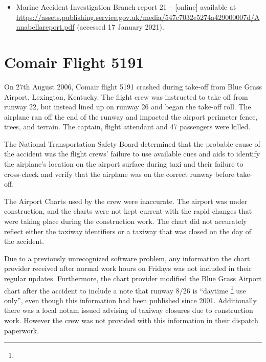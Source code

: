 \begin{itemize}
\item Marine Accident Investigation Branch report 21 --  [online] available at \href{https://assets.publishing.service.gov.uk/media/547c7032e5274a429000007d/Annabellareport.pdf}{https://assets.publishing.service.gov.uk/media/547c7032e5274a429000007d/Annabellareport.pdf} (accessed 17 January 2021).
\end{itemize}

\section{Comair Flight 5191} \label{bkm:incacc:comair5191}
On 27th August 2006, Comair flight 5191 crashed during take-off from Blue Grass Airport, Lexington, Kentucky. The flight crew was instructed to take off from runway 22, but instead lined up on runway 26 and began the take-off roll. The airplane ran off the end of the runway and impacted the airport perimeter fence, trees, and terrain. The captain, flight attendant and 47 passengers were killed.

The National Transportation Safety Board determined that the probable cause of the accident was the flight crews' failure to use available cues and aids to identify the airplane's location on the airport surface during taxi and their failure to cross-check and verify that the airplane was on the correct runway before take-off.

The Airport Charts used by the crew were inaccurate. The airport was under construction, and the charts were not kept current with the rapid changes that were taking place during the construction work. The chart did not accurately reflect either the taxiway identifiers or a taxiway that was closed on the day of the accident.

Due to a previously unrecognized software problem, any \gls{information} the chart provider received after normal work hours on Fridays was not included in their regular updates. Furthermore, the chart provider modified the Blue Grass Airport chart after the accident to include a note that runway 8/26 is ``daytime \footnote{} use only'', even though this \gls{information} had been published since 2001. Additionally there was a local \gls{notam} issued advising of taxiway closures due to construction work. However the crew was not provided with this \gls{information} in their dispatch paperwork.

